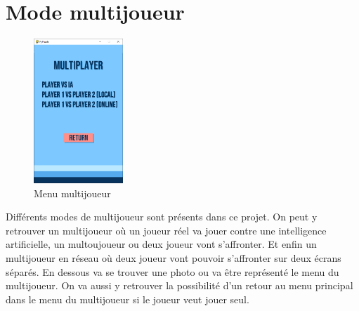 \documentclass[a4paper]{report}
\begin{document}
\section{Mode multijoueur}
\begin{figure}
    \centering
    \includegraphics[width=0.3\textwidth, trim=0pt 0pt 0pt 150pt]{images/2-menumulti.png}
    \caption{Menu multijoueur}
    \vspace{-20pt}
\end{figure}
Différents modes de multijoueur sont présents dans ce projet. On peut y retrouver un multijoueur où un joueur réel va jouer contre une intelligence artificielle, un multoujoueur ou deux joueur vont s'affronter. Et enfin un multijoueur en réseau où deux joueur vont pouvoir s'affronter sur deux écrans séparés. En dessous va se trouver une photo ou va être représenté le menu du multijoueur. On va aussi y retrouver la possibilité d'un retour au menu principal dans le menu du multijoueur si le joueur veut jouer seul.\\
\end{document}
